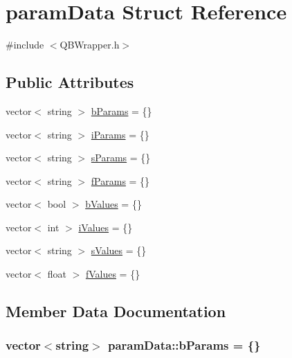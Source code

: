 \hypertarget{structparam_data}{}\section{param\+Data Struct Reference}
\label{structparam_data}


{\ttfamily \#include $<$Q\+B\+Wrapper.\+h$>$}

\subsection*{Public Attributes}
\begin{DoxyCompactItemize}
\item 
vector$<$ string $>$ \hyperlink{structparam_data_a2601bc4a92cb63714403a3cac4d55cfa}{b\+Params} = \{\}
\item 
vector$<$ string $>$ \hyperlink{structparam_data_ab973b0f2e408f0075b474e94f0b62fc5}{i\+Params} = \{\}
\item 
vector$<$ string $>$ \hyperlink{structparam_data_a19da62f881dccbf0f63c423e896ad8d1}{s\+Params} = \{\}
\item 
vector$<$ string $>$ \hyperlink{structparam_data_a645656536b9d6a8f716effeae49acbab}{f\+Params} = \{\}
\item 
vector$<$ bool $>$ \hyperlink{structparam_data_a0e70736d8fef01a994cb6282dcdcfc54}{b\+Values} = \{\}
\item 
vector$<$ int $>$ \hyperlink{structparam_data_a524931886354bfbd088178860999f9e1}{i\+Values} = \{\}
\item 
vector$<$ string $>$ \hyperlink{structparam_data_a530e1ec7867fb4713b34a1dfa0cffe14}{s\+Values} = \{\}
\item 
vector$<$ float $>$ \hyperlink{structparam_data_aded9de47eea4d3861aed3c649511648d}{f\+Values} = \{\}
\end{DoxyCompactItemize}


\subsection{Member Data Documentation}
\hypertarget{structparam_data_a2601bc4a92cb63714403a3cac4d55cfa}{}
\subsubsection[{b\+Params}]{\setlength{\rightskip}{0pt plus 5cm}vector$<$string$>$ param\+Data\+::b\+Params = \{\}}\label{structparam_data_a2601bc4a92cb63714403a3cac4d55cfa}
\hypertarget{structparam_data_a0e70736d8fef01a994cb6282dcdcfc54}{}

